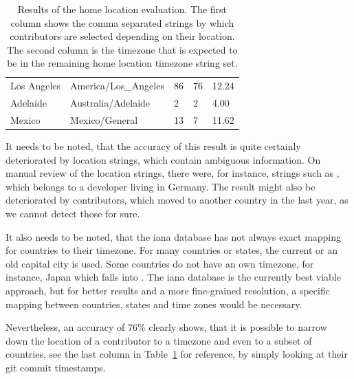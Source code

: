 \begin{landscape}
\begin{table}[]
\begin{tabular}{lllll}
            Los Angeles          & America/Los\_Angeles & 86         & 76      & 12.24   &        \\
            Adelaide             & Australia/Adelaide   & 2          & 2       & 4.00    &        \\
            Mexico               & Mexico/General       & 13         & 7       & 11.62   &        \\
            \bottomrule
        \end{tabular}
        \caption{Results of the home location evaluation.
        The first column shows the comma separated strings by which contributors are selected depending on their location.
        The second column is the timezone that is expected to be in the remaining home location timezone string set.
    }\label{home-location-table}
    \end{table}
\end{landscape}

It needs to be noted, that the accuracy of this result is quite certainly deteriorated by location strings, which contain ambiguous information.
On manual review of the location strings, there were, for instance, strings such as , which belongs to a developer living in Germany.
The result might also be deteriorated by contributors, which moved to another country in the last year, as we cannot detect those for sure.

It also needs to be noted, that the \ac{iana} database has not always exact mapping for countries to their timezone.
For many countries or states, the current or an old capital city is used.
Some countries do not have an own timezone, for instance, Japan which falls into .
The \ac{iana} database is the currently best viable approach, but for better results and a more fine-grained resolution, a specific mapping between countries, states and time zones would be necessary.

Nevertheless, an accuracy of 76\% clearly shows, that it is possible to narrow down the location of a contributor to a timezone and even to a subset of countries, see the last column in Table~\ref{home-location-table} for reference, by simply looking at their git commit timestamps.
